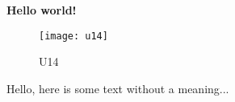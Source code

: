 \documentclass[../main.tex]{subfiles}
\begin{document}
\textbf{Hello world!}
\begin{figure}[bh]
\centering
\texttt{[image: u14]}

\label{fig:img1}
\caption{U14}
\end{figure}

Hello, here is some text without a meaning...
\end{document}
